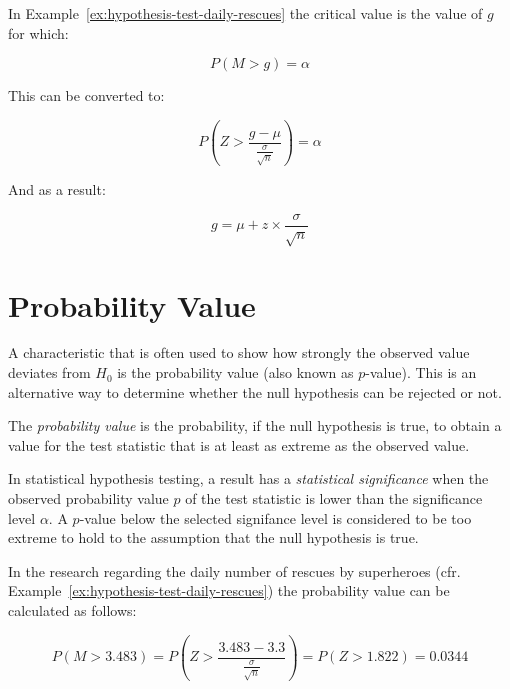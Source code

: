 In Example~\ref{ex:hypothesis-test-daily-rescues} the critical value is the value of $g$ for which:

\[ P(M > g) = \alpha \]

This can be converted to:

\[ P(Z > \frac{g - \mu}{\frac{\sigma}{\sqrt{n}}}) = \alpha \]

And as a result:

\begin{equation}
  \label{eq:critical-value-right-tail}
  g = \mu + z \times \frac{\sigma}{\sqrt{n}}
\end{equation}

\section{Probability Value}
\label{sec:probability-value}

A characteristic that is often used to show how strongly the observed value deviates from $H_{0}$ is the probability value (also known as $p$-value). This is an alternative way to determine whether the null hypothesis can be rejected or not.

\begin{definition}
  The \emph{probability value} is the probability, if the null hypothesis is true, to obtain a value for the test statistic that is at least as extreme as the observed value.
\end{definition}

\begin{definition}
  In statistical hypothesis testing, a result has a \emph{statistical significance} when the observed probability value $p$ of the test statistic is lower than the significance level $\alpha$.
  A $p$-value below the selected signifance level is considered to be too extreme to hold to the assumption that the null hypothesis is true.
\end{definition}

\begin{example}
  In the research regarding the daily number of rescues by superheroes (cfr. Example~\ref{ex:hypothesis-test-daily-rescues}) the probability value can be calculated as follows:
  
  \[ P(M > 3.483) = P \left(Z> \frac{3.483 - 3.3}{\frac{\sigma}{\sqrt{n}}}\right) = P (Z > 1.822) = 0.0344 \]
\end{example}

